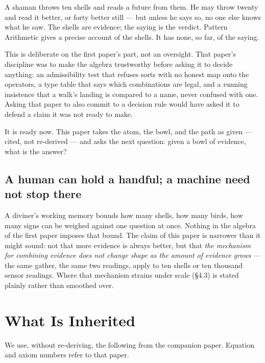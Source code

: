 \documentclass[12pt, a4paper]{article}
\begin{document}
A shaman throws ten shells and reads a future from them. He may throw
twenty and read it better, or forty better still --- but unless he
says so, no one else knows what he saw. The shells are evidence; the
saying is the verdict. Pattern Arithmetic gives a precise account of
the shells. It has none, so far, of the saying.

This is deliberate on the first paper's part, not an oversight. That
paper's discipline was to make the algebra trustworthy before asking
it to decide anything: an admissibility test that refuses sorts with
no honest map onto the operators, a type table that says which
combinations are legal, and a running insistence that a walk's landing
is compared to a name, never confused with one. Asking that paper to
also commit to a decision rule would have asked it to defend a claim
it was not ready to make.

It is ready now. This paper takes the atom, the bowl, and the path as
given --- cited, not re-derived --- and asks the next question: given
a bowl of evidence, what is the answer?

\subsection{A human can hold a handful; a machine need not stop
there}
A diviner's working memory bounds how many shells, how many birds, how
many signs can be weighed against one question at once. Nothing in
the algebra of the first paper imposes that bound. The claim of this
paper is narrower than it might sound: not that more evidence is
always better, but that \emph{the mechanism for combining evidence
does not change shape as the amount of evidence grows} --- the same
gather, the same two readings, apply to ten shells or ten thousand
sensor readings. Where that mechanism strains under scale (\S 4.3) is
stated plainly rather than smoothed over.

\section{What Is Inherited}
\label{sec:inherited}

We use, without re-deriving, the following from the companion paper.
Equation and axiom numbers refer to that paper.
\end{document}
